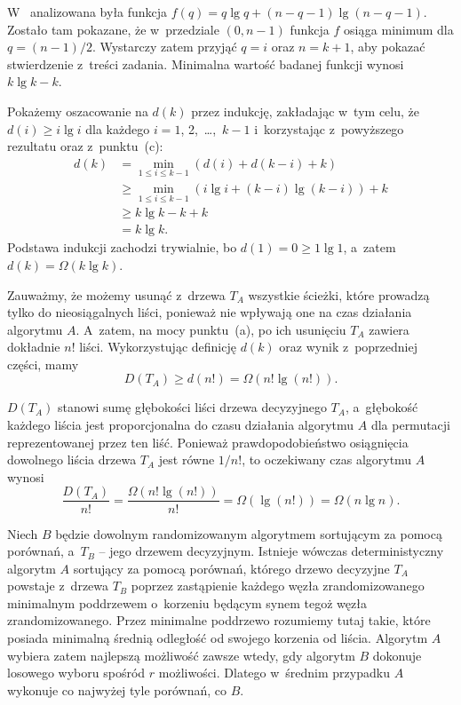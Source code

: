 \subproblem %
W~ analizowana była funkcja $f(q)=q\lg q+(n-q-1)\lg(n-q-1)$. Zostało tam pokazane, że w~przedziale $(0,n-1)$ funkcja $f$ osiąga minimum dla $q=(n-1)/2$. Wystarczy zatem przyjąć $q=i$ oraz $n=k+1$, aby pokazać stwierdzenie z~treści zadania. Minimalna wartość badanej funkcji wynosi $k\lg k-k$.

Pokażemy oszacowanie na $d(k)$ przez indukcję, zakładając w~tym celu, że $d(i)\ge i\lg i$ dla każdego $i=1$, 2,~\dots,~$k-1$ i~korzystając z~powyższego rezultatu oraz z~punktu~(c):
\begin{align*}
	d(k) &= \min_{1\le i\le k-1}(d(i)+d(k-i)+k) \\
	&\ge \min_{1\le i\le k-1}(i\lg i+(k-i)\lg(k-i))+k \\
	&\ge k\lg k-k+k \\
	&= k\lg k.
\end{align*}
Podstawa indukcji zachodzi trywialnie, bo $d(1)=0\ge 1\lg1$, a~zatem $d(k)=\Omega(k\lg k)$.

\subproblem %
Zauważmy, że możemy usunąć z~drzewa $T_A$ wszystkie ścieżki, które prowadzą tylko do nieosiągalnych liści, ponieważ nie wpływają one na czas działania algorytmu $A$. A~zatem, na mocy punktu~(a), po ich usunięciu $T_A$ zawiera dokładnie $n!$ liści. Wykorzystując definicję $d(k)$ oraz wynik z~poprzedniej części, mamy
\[
	D(T_A) \ge d(n!) = \Omega(n!\lg(n!)).
\]

$D(T_A)$ stanowi sumę głębokości liści drzewa decyzyjnego $T_A$, a~głębokość każdego liścia jest proporcjonalna do czasu działania algorytmu $A$ dla permutacji reprezentowanej przez ten liść. Ponieważ prawdopodobieństwo osiągnięcia dowolnego liścia drzewa $T_A$ jest równe $1/n!$, to oczekiwany czas algorytmu $A$ wynosi
\[
	\frac{D(T_A)}{n!} = \frac{\Omega(n!\lg(n!))}{n!} = \Omega(\lg(n!)) = \Omega(n\lg n).
\]

\subproblem %
Niech $B$ będzie dowolnym randomizowanym algorytmem sortującym za pomocą porównań, a~$T_B$ -- jego drzewem decyzyjnym. Istnieje wówczas deterministyczny algorytm $A$ sortujący za pomocą porównań, którego drzewo decyzyjne $T_A$ powstaje z~drzewa $T_B$ poprzez zastąpienie każdego węzła zrandomizowanego minimalnym poddrzewem o~korzeniu będącym synem tegoż węzła zrandomizowanego. Przez minimalne poddrzewo rozumiemy tutaj takie, które posiada minimalną średnią odległość od swojego korzenia od liścia. Algorytm $A$ wybiera zatem najlepszą możliwość zawsze wtedy, gdy algorytm $B$ dokonuje losowego wyboru spośród $r$ możliwości. Dlatego w~średnim przypadku $A$ wykonuje co najwyżej tyle porównań, co $B$.

